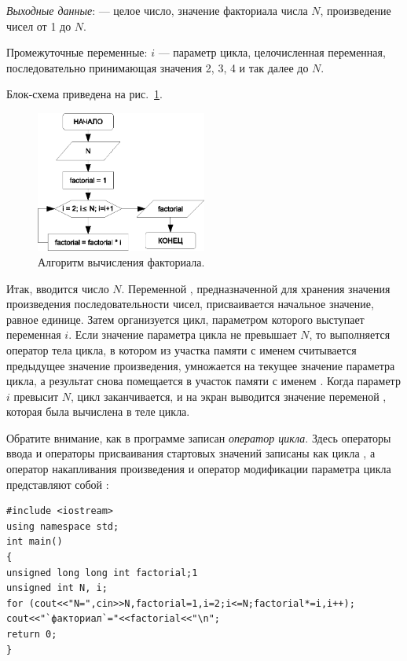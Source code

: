 \emph{Выходные данные}:  --- целое число, значение факториала числа $N$,
произведение чисел от 1 до $N$.

Промежуточные переменные: $i$ --- параметр цикла, целочисленная переменная, последовательно принимающая
значения 2, 3, 4 и так далее до $N$.

Блок-схема приведена на рис.~\ref{ch03:refDrawing28}.
\begin{figure}[htb]
\begin{center}
\includegraphics[width=0.5\textwidth]{img/ris_3_29}
\caption{Алгоритм вычисления факториала.}
\label{ch03:refDrawing28}
\end{center}
\end{figure}


Итак, вводится число $N$. Переменной , предназначенной для хранения
значения произведения последовательности чисел, присваивается начальное значение, равное единице. Затем организуется
цикл, параметром которого выступает переменная $i$. Если значение параметра цикла не превышает
$N$, то выполняется оператор тела цикла, в котором из участка памяти с именем
 считывается предыдущее значение произведения, умножается на текущее значение параметра
цикла, а результат снова помещается в участок памяти с именем . Когда параметр
$i$ превысит $N$, цикл заканчивается, и на экран выводится значение переменой
, которая была вычислена в теле цикла.

Обратите внимание, как в программе записан \emph{оператор цикла}. Здесь операторы ввода и операторы
присваивания стартовых значений записаны как  цикла , а
оператор накапливания произведения и оператор модификации параметра цикла представляют собой
:
\begin{lstlisting}
#include <iostream>
using namespace std;
int main()
{
unsigned long long int factorial;1
unsigned int N, i;
for (cout<<"N=",cin>>N,factorial=1,i=2;i<=N;factorial*=i,i++);
cout<<"`факториал`="<<factorial<<"\n";
return 0;
}
\end{lstlisting}

